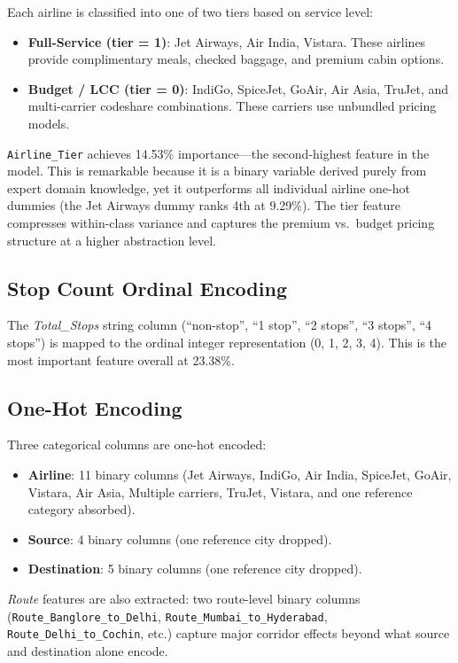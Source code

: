 \documentclass[12pt, a4paper]{article}
\begin{document}
Each airline is classified into one of two tiers based on service level:
\begin{itemize}
    \item \textbf{Full-Service (tier = 1)}: Jet Airways, Air India, Vistara.
    These airlines provide complimentary meals, checked baggage, and premium
    cabin options.
    \item \textbf{Budget / LCC (tier = 0)}: IndiGo, SpiceJet, GoAir, Air Asia,
    TruJet, and multi-carrier codeshare combinations.
    These carriers use unbundled pricing models.
\end{itemize}

\texttt{Airline\_Tier} achieves 14.53\% importance---the second-highest feature
in the model.  This is remarkable because it is a binary variable derived
purely from expert domain knowledge, yet it outperforms all individual airline
one-hot dummies (the Jet Airways dummy ranks 4th at 9.29\%).  The tier feature
compresses within-class variance and captures the premium vs.\ budget pricing
structure at a higher abstraction level.

\subsection{Stop Count Ordinal Encoding}

The \textit{Total\_Stops} string column (``non-stop'', ``1 stop'', ``2 stops'',
``3 stops'', ``4 stops'') is mapped to the ordinal integer representation
(0, 1, 2, 3, 4).  This is the most important feature overall at 23.38\%.

\subsection{One-Hot Encoding}

Three categorical columns are one-hot encoded:
\begin{itemize}
    \item \textbf{Airline}: 11 binary columns (Jet Airways, IndiGo, Air India,
    SpiceJet, GoAir, Vistara, Air Asia, Multiple carriers, TruJet,
    Vistara, and one reference category absorbed).
    \item \textbf{Source}: 4 binary columns (one reference city dropped).
    \item \textbf{Destination}: 5 binary columns (one reference city dropped).
\end{itemize}

\textit{Route} features are also extracted: two route-level binary columns
(\texttt{Route\_Banglore\_to\_Delhi}, \texttt{Route\_Mumbai\_to\_Hyderabad},
\texttt{Route\_Delhi\_to\_Cochin}, etc.) capture major corridor effects beyond
what source and destination alone encode.
\end{document}
